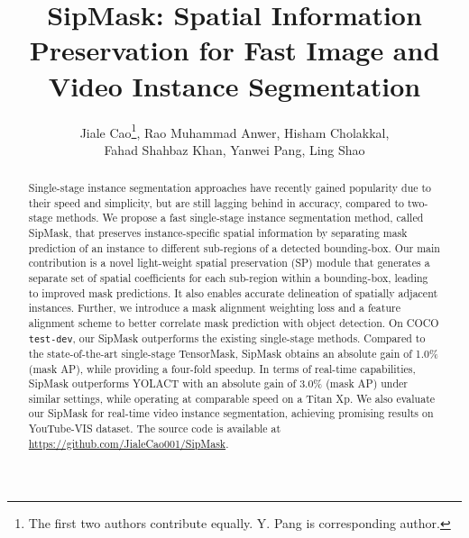 \documentclass[runningheads]{llncs}
\begin{document}
\pagestyle{headings}
\mainmatter
\def\ECCVSubNumber{2057}  

\title{SipMask: Spatial Information Preservation for Fast Image and Video Instance Segmentation} 



\author{Jiale Cao\thanks{The first two authors contribute equally.  Y. Pang is corresponding author.}, Rao Muhammad Anwer, Hisham Cholakkal, \\Fahad Shahbaz Khan, Yanwei Pang, Ling Shao}
\maketitle

\begin{abstract}
Single-stage instance segmentation approaches have recently gained popularity due to their speed and simplicity, but are still lagging behind in accuracy, compared to two-stage methods. We propose a fast single-stage instance segmentation method, called SipMask, that preserves instance-specific spatial information by separating mask prediction of an instance to different sub-regions of a detected bounding-box. Our main contribution is a novel light-weight spatial preservation (SP) module that generates a separate  set of spatial coefficients for each sub-region within a bounding-box, leading to improved mask predictions. It also enables accurate delineation of spatially adjacent instances. Further, we introduce a mask alignment weighting loss and a feature alignment scheme to better correlate mask prediction with object detection. On COCO \texttt{test-dev}, our SipMask outperforms the existing single-stage methods. Compared to the state-of-the-art single-stage TensorMask, SipMask obtains an absolute gain of 1.0\% (mask AP), while providing a four-fold speedup. In terms of real-time capabilities, SipMask outperforms YOLACT with an absolute gain of 3.0\% (mask AP) under similar settings, while operating at comparable speed on a Titan Xp. We also evaluate our SipMask for real-time video instance segmentation, achieving promising results on YouTube-VIS dataset. The source code is available at \url{https://github.com/JialeCao001/SipMask}.  


\end{abstract}
\end{document}
